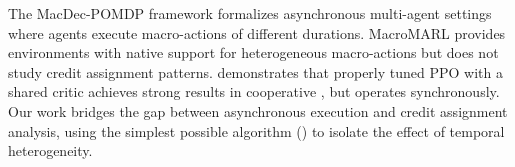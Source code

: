 The MacDec-POMDP framework \citep{amato2019modeling} formalizes asynchronous multi-agent settings where agents execute macro-actions of different durations. MacroMARL provides environments with native support for heterogeneous macro-actions but does not study credit assignment patterns. \mappo \citep{yu2022mappo} demonstrates that properly tuned PPO with a shared critic achieves strong results in cooperative \marl, but operates synchronously. Our work bridges the gap between asynchronous execution and credit assignment analysis, using the simplest possible algorithm (\ippo) to isolate the effect of temporal heterogeneity.
